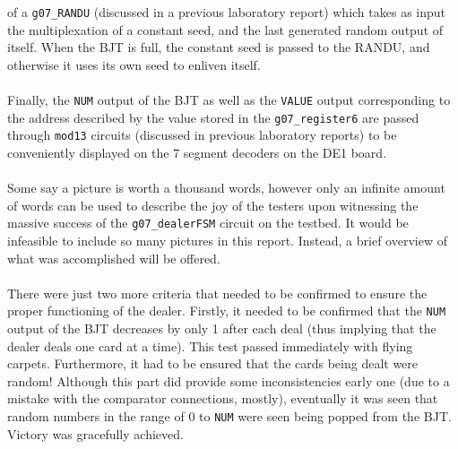 \documentclass[12pt]{report}
\begin{document}
of a \texttt{g07\_RANDU} (discussed in a previous laboratory report) which takes as input the
multiplexation of a constant seed, and the last generated random output of itself. When the BJT is
full, the constant seed is passed to the RANDU, and otherwise it uses its own seed to enliven
itself.\\\\
Finally, the \texttt{NUM} output of the BJT as well as the \texttt{VALUE} output corresponding to
the address described by the value stored in the \texttt{g07\_register6} are passed through
\texttt{mod13} circuits (discussed in previous laboratory reports) to be conveniently displayed on
the 7 segment decoders on the DE1 board.\\\\
Some say a picture is worth a thousand words, however only an infinite amount of words can be used
to describe the joy of the testers upon witnessing the massive success of the
\texttt{g07\_dealerFSM} circuit on the testbed. It would be infeasible to include so many pictures
in this report. Instead, a brief overview of what was accomplished will be offered.\\\\
There were just two more criteria that needed to be confirmed to ensure the proper functioning of
the dealer. Firstly, it needed to be confirmed that the \texttt{NUM} output of the BJT decreases by
only 1 after each deal (thus implying that the dealer deals one card at a time). This test passed
immediately with flying carpets. Furthermore, it had to be ensured that the cards being dealt were
random! Although this part did provide some inconsistencies early one (due to a mistake with the
comparator connections, mostly), eventually it was seen that random numbers in the range of 0 to
\texttt{NUM} were seen being popped from the BJT. Victory was gracefully achieved.
\end{document}
